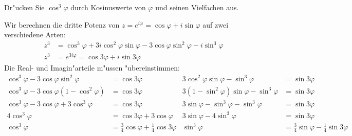 Dr"ucken Sie $\cos^3\varphi$ durch Kosinuswerte von $\varphi$ und seinen
Vielfachen aus.

\begin{loesung}
Wir berechnen die dritte Potenz von $z=e^{i\varphi}=\cos\varphi+i\sin\varphi$
auf zwei verschiedene Arten:
\begin{align*}
z^3
&=
\cos^3\varphi + 3i\cos^2\varphi\sin\varphi - 3 \cos\varphi\sin^2\varphi
-i\sin^3\varphi
\\
z^3
&=
e^{3i\varphi}=\cos3\varphi+i\sin3\varphi
\end{align*}
Die Real- und Imagin"arteile m"ussen "ubereinstimmen:
\begin{align*}
\cos^3\varphi-3\cos\varphi\sin^2\varphi
&=
\cos3\varphi
&
3\cos^2\varphi\sin\varphi-\sin^3\varphi
&=
\sin3\varphi
\\
\cos^3\varphi-3\cos\varphi(1-\cos^2\varphi)
&=
\cos3\varphi
&
3(1-\sin^2\varphi)\sin\varphi-\sin^3\varphi
&=
\sin3\varphi
\\
\cos^3\varphi-3\cos\varphi + 3\cos^3\varphi
&=
\cos3\varphi
&
3\sin\varphi -\sin^3\varphi-\sin^3\varphi
&=
\sin3\varphi
\\
4\cos^3\varphi
&=
\cos3\varphi
+
3\cos\varphi
&
3\sin\varphi -4\sin^3\varphi
&=
\sin3\varphi
\\
\cos^3\varphi
&=
\frac34 \cos\varphi
+
\frac14 \cos3\varphi
&
\sin^3\varphi
&=
\frac34 \sin\varphi
-
\frac14\sin3\varphi
\end{align*}
\end{loesung}

